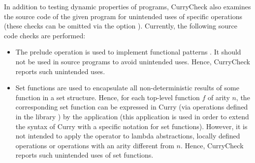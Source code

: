 In addition to testing dynamic properties of programs,
CurryCheck also examines the source code of the given
program for unintended uses of specific operations
(these checks can be omitted via the option ).
Currently, the following source code checks are performed:

\begin{itemize}
\item
The prelude operation \ccode{=:<=} is used to implement
functional patterns \cite{AntoyHanus05LOPSTR}. It should not be
used in source programs to avoid unintended uses.
Hence, CurryCheck reports such unintended uses.
\item
Set functions \cite{AntoyHanus09} are used to encapsulate
all non-deterministic results of some function in a set structure.
Hence, for each top-level function $f$ of arity $n$,
the corresponding set function can be expressed in Curry
(via operations defined in the library )
by the application  (this application is used
in order to extend the syntax of Curry with a specific notation
for set functions).
However, it is not intended to apply the operator 
to lambda abstractions, locally defined operations
or operations with an arity different from $n$.
Hence, CurryCheck reports such unintended uses of set functions.
\end{itemize}



